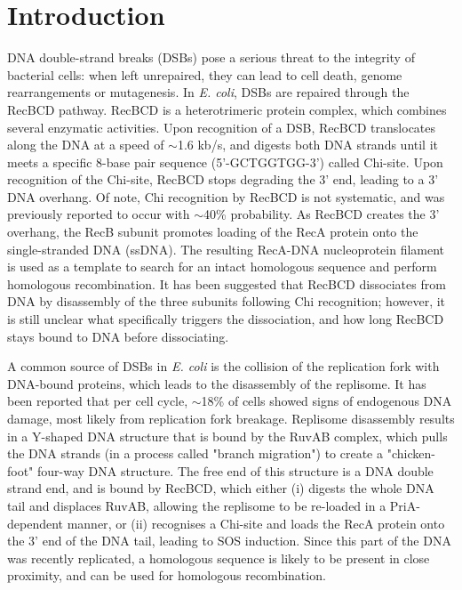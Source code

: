 \section*{Introduction}

DNA double-strand breaks (DSBs) pose a serious threat to the integrity of bacterial cells: when left unrepaired, they can lead to cell death, genome rearrangements or mutagenesis\cite{Wyman2006}. In \emph{E. coli}, DSBs are repaired through the RecBCD pathway. RecBCD is a heterotrimeric protein complex, which combines several enzymatic activities\cite{Dillingham2008}. Upon recognition of a DSB, RecBCD translocates along the DNA at a speed of $\sim$1.6 kb/s\cite{Wiktor2018}, and digests both DNA strands until it meets a specific 8-base pair sequence (5'-GCTGGTGG-3') called Chi-site. Upon recognition of the Chi-site, RecBCD stops degrading the 3' end, leading to a 3' DNA overhang. Of note, Chi recognition by RecBCD is not systematic, and was previously reported to occur with $\sim$40\% probability\cite{Taylor1992,Cockram2015}. As RecBCD creates the 3' overhang, the RecB subunit promotes loading of the RecA protein onto the single-stranded DNA (ssDNA)\cite{Churchill2000, Spies2006}. The resulting RecA-DNA nucleoprotein filament is used as a template to search for an intact homologous sequence and perform homologous recombination\cite{Wyman2004,Wiktor2021}. It has been suggested that RecBCD dissociates from DNA by disassembly of the three subunits following Chi recognition\cite{Taylor1999}; however, it is still unclear what specifically triggers the dissociation, and how long RecBCD stays bound to DNA before dissociating.

A common source of DSBs in \emph{E. coli} is the collision of the replication fork with DNA-bound proteins, which leads to the disassembly of the replisome\cite{Michel1997}. It has been reported that per cell cycle, $\sim$18\% of cells showed signs of endogenous DNA damage, most likely from replication fork breakage\cite{Sinha2018}. Replisome disassembly results in a Y-shaped DNA structure that is bound by the RuvAB complex, which pulls the DNA strands (in a process called "branch migration") to create a "chicken-foot" four-way DNA structure\cite{Seigneur1998}. The free end of this structure is a DNA double strand end, and is bound by RecBCD, which either (i) digests the whole DNA tail and displaces RuvAB, allowing the replisome to be re-loaded in a PriA-dependent manner\cite{Seigneur1998}, or (ii) recognises a Chi-site and loads the RecA protein onto the 3' end of the DNA tail, leading to SOS induction\cite{Michel2001}. Since this part of the DNA was recently replicated, a homologous sequence is likely to be present in close proximity, and can be used for homologous recombination.

